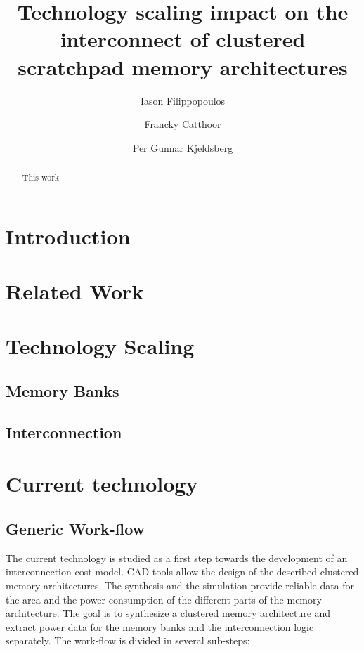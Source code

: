 \documentclass[12pt,a4paper]{article}
\author{Iason Filippopoulos \and Francky Catthoor \and Per Gunnar Kjeldsberg}
\title{Technology scaling impact on the interconnect of clustered scratchpad memory architectures}
\begin{document}
\maketitle

\begin{abstract}
This work
\end{abstract}

\section{Introduction}


\section{Related Work}


\section{Technology Scaling}

\subsection{Memory Banks}

\subsection{Interconnection}


\section{Current technology}

\subsection{Generic Work-flow}

The current technology is studied as a first step towards the development of an interconnection cost model. 
CAD tools allow the design of the described clustered memory architectures.
The synthesis and the simulation provide reliable data for the area and the power consumption of the different parts of the memory architecture.
The goal is to synthesize a clustered memory architecture and extract power data for the memory banks and the interconnection logic separately.
The work-flow is divided in several sub-steps:
\end{document}
